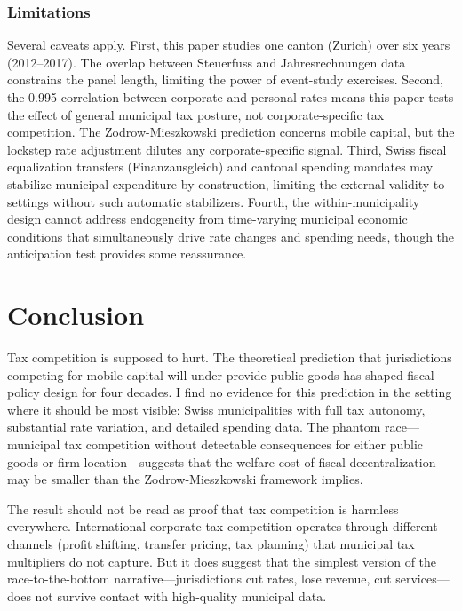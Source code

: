 \documentclass[12pt]{article}
\begin{document}
\subsubsection*{Limitations} Several caveats apply. First, this paper studies one canton (Zurich) over six years (2012--2017). The overlap between Steuerfuss and Jahresrechnungen data constrains the panel length, limiting the power of event-study exercises. Second, the 0.995 correlation between corporate and personal rates means this paper tests the effect of general municipal tax posture, not corporate-specific tax competition. The Zodrow-Mieszkowski prediction concerns mobile capital, but the lockstep rate adjustment dilutes any corporate-specific signal. Third, Swiss fiscal equalization transfers (Finanzausgleich) and cantonal spending mandates may stabilize municipal expenditure by construction, limiting the external validity to settings without such automatic stabilizers. Fourth, the within-municipality design cannot address endogeneity from time-varying municipal economic conditions that simultaneously drive rate changes and spending needs, though the anticipation test provides some reassurance.


\section{Conclusion}
\label{sec:conclusion}

Tax competition is supposed to hurt. The theoretical prediction that jurisdictions competing for mobile capital will under-provide public goods has shaped fiscal policy design for four decades. I find no evidence for this prediction in the setting where it should be most visible: Swiss municipalities with full tax autonomy, substantial rate variation, and detailed spending data. The phantom race---municipal tax competition without detectable consequences for either public goods or firm location---suggests that the welfare cost of fiscal decentralization may be smaller than the Zodrow-Mieszkowski framework implies.

The result should not be read as proof that tax competition is harmless everywhere. International corporate tax competition operates through different channels (profit shifting, transfer pricing, tax planning) that municipal tax multipliers do not capture. But it does suggest that the simplest version of the race-to-the-bottom narrative---jurisdictions cut rates, lose revenue, cut services---does not survive contact with high-quality municipal data.
\end{document}
